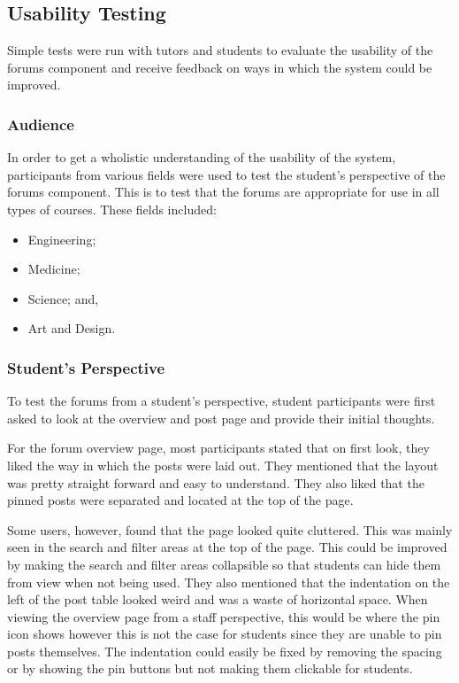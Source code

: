 \subsection{Usability Testing}

Simple tests were run with tutors and students to evaluate the usability of the forums component and receive feedback on ways in which the system could be improved.

\subsubsection{Audience}

In order to get a wholistic understanding of the usability of the system, participants from various fields were used to test the student's perspective of the forums component.
This is to test that the forums are appropriate for use in all types of courses. These fields included:

\begin{itemize}
    \item Engineering;
    \item Medicine;
    \item Science; and,
    \item Art and Design.
\end{itemize}

\subsubsection{Student's Perspective}

To test the forums from a student's perspective, student participants were first asked to look at the overview and post page and provide their initial thoughts.

For the forum overview page, most participants stated that on first look, they liked the way in which the posts were laid out.
They mentioned that the layout was pretty straight forward and easy to understand.
They also liked that the pinned posts were separated and located at the top of the page.

Some users, however, found that the page looked quite cluttered.
This was mainly seen in the search and filter areas at the top of the page.
This could be improved by making the search and filter areas collapsible so that students can hide them from view when not being used.
They also mentioned that the indentation on the left of the post table looked weird and was a waste of horizontal space.
When viewing the overview page from a staff perspective, this would be where the pin icon shows however this is not the case for students since they are unable to pin posts themselves.
The indentation could easily be fixed by removing the spacing or by showing the pin buttons but not making them clickable for students.

